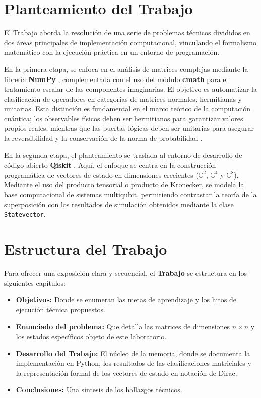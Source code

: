 \documentclass[11pt,a4paper,spanish]{book}
\begin{document}
\section{Planteamiento del Trabajo}
El Trabajo aborda la resolución de una serie de problemas técnicos divididos en dos áreas principales de implementación computacional, vinculando el formalismo matemático con la ejecución práctica en un entorno de programación.

En la primera etapa, se enfoca en el análisis de matrices complejas mediante la librería \textbf{NumPy} \citep{harris2020}, complementada con el uso del módulo \textbf{cmath} para el tratamiento escalar de las componentes imaginarias. El objetivo es automatizar la clasificación de operadores en categorías de matrices normales, hermitianas y unitarias. Esta distinción es fundamental en el marco teórico de la computación cuántica; los observables físicos deben ser hermitianos para garantizar valores propios reales, mientras que las puertas lógicas deben ser unitarias para asegurar la reversibilidad y la conservación de la norma de probabilidad \citep{nielsen2010}.

En la segunda etapa, el planteamiento se traslada al entorno de desarrollo de código abierto \textbf{Qiskit} \citep{qiskit2023}. Aquí, el enfoque se centra en la construcción programática de vectores de estado en dimensiones crecientes ($\mathbb{C}^2$, $\mathbb{C}^4$ y $\mathbb{C}^8$). Mediante el uso del producto tensorial o producto de Kronecker, se modela la base computacional de sistemas multiqubit, permitiendo contrastar la teoría de la superposición con los resultados de simulación obtenidos mediante la clase \texttt{Statevector}.

\section{Estructura del Trabajo}
Para ofrecer una exposición clara y secuencial, el \textbf{Trabajo} se estructura en los siguientes capítulos:
\begin{itemize}
    \item \textbf{Objetivos:} Donde se enumeran las metas de aprendizaje y los hitos de ejecución técnica propuestos.
    \item \textbf{Enunciado del problema:} Que detalla las matrices de dimensiones $n \times n$ y los estados específicos objeto de este laboratorio.
    \item \textbf{Desarrollo del Trabajo:} El núcleo de la memoria, donde se documenta la implementación en Python, los resultados de las clasificaciones matriciales y la representación formal de los vectores de estado en notación de Dirac.
    \item \textbf{Conclusiones:} Una síntesis de los hallazgos técnicos.
\end{itemize}
\end{document}
